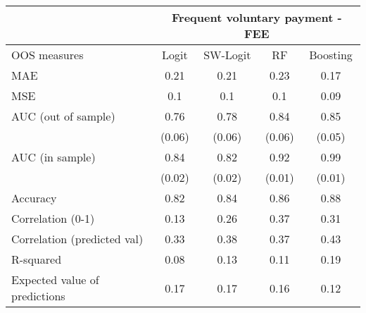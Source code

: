 \begin{tabular}{lcccc}
\toprule
      & \multicolumn{4}{c}{Frequent voluntary payment - FEE} \\
\midrule
\midrule
OOS measures & Logit & SW-Logit & RF    & Boosting \\
\midrule
\midrule
MAE   & 0.21  & 0.21  & 0.23  & 0.17 \\
MSE   & 0.1   & 0.1   & 0.1   & 0.09 \\
AUC (out of sample) & 0.76  & 0.78  & 0.84  & 0.85 \\
      & (0.06) & (0.06) & (0.06) & (0.05) \\
AUC (in sample) & 0.84  & 0.82  & 0.92  & 0.99 \\
      & (0.02) & (0.02) & (0.01) & (0.01) \\
Accuracy & 0.82  & 0.84  & 0.86  & 0.88 \\
Correlation (0-1) & 0.13  & 0.26  & 0.37  & 0.31 \\
Correlation (predicted val) & 0.33  & 0.38  & 0.37  & 0.43 \\
R-squared  & 0.08  & 0.13  & 0.11  & 0.19 \\
Expected value of predictions & 0.17  & 0.17  & 0.16  & 0.12 \\
\bottomrule
\bottomrule
\end{tabular}%
